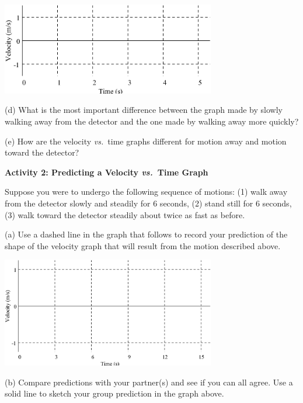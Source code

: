\vspace{0.3cm}
{\par\centering \includegraphics[width=0.7\textwidth]{velocity/velocity_fig1.eps} \par}
\vspace{0.3cm}

(d) What is the most important difference between the graph made by slowly walking
away from the detector and the one made by walking away more quickly? 
\answerspace{25mm}

(e) How are the velocity \textit{vs.}~time graphs different for motion away and motion
toward the detector?
\answerspace{25mm}

\pagebreak[2]
\textbf{Activity 2: Predicting a Velocity \textit{vs.}~Time Graph }

Suppose you were to undergo the following sequence of motions: (1) walk away
from the detector slowly and steadily for 6 seconds, (2) stand still for 6 seconds,
(3) walk toward the detector steadily about twice as fast as before.

(a) Use a dashed line in the graph that follows to record your prediction of
the shape of the velocity graph that will result from the motion described above.

\vspace{0.3cm}
{\par\centering \includegraphics[width=0.7\textwidth]{velocity/velocity_fig2.eps} \par}
\vspace{0.3cm}

(b) Compare predictions with your partner(s) and see if you can all agree. Use
a solid line to sketch your group prediction in the graph above.

